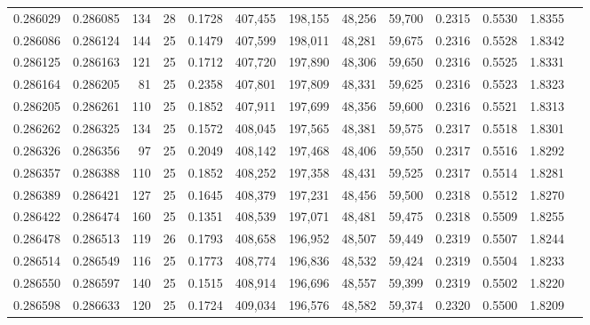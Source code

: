 \begin{tabular}{rrrrrrrrrrrrr}
0.286029 & 0.286085 &   134 &  28 &                                     0.1728 & 407,455 & 198,155 &  48,256 &  59,700 & 0.2315 & 0.5530 & 1.8355 \\
0.286086 & 0.286124 &   144 &  25 &                                     0.1479 & 407,599 & 198,011 &  48,281 &  59,675 & 0.2316 & 0.5528 & 1.8342 \\
0.286125 & 0.286163 &   121 &  25 &                                     0.1712 & 407,720 & 197,890 &  48,306 &  59,650 & 0.2316 & 0.5525 & 1.8331 \\
0.286164 & 0.286205 &    81 &  25 &                                     0.2358 & 407,801 & 197,809 &  48,331 &  59,625 & 0.2316 & 0.5523 & 1.8323 \\
0.286205 & 0.286261 &   110 &  25 &                                     0.1852 & 407,911 & 197,699 &  48,356 &  59,600 & 0.2316 & 0.5521 & 1.8313 \\
0.286262 & 0.286325 &   134 &  25 &                                     0.1572 & 408,045 & 197,565 &  48,381 &  59,575 & 0.2317 & 0.5518 & 1.8301 \\
0.286326 & 0.286356 &    97 &  25 &                                     0.2049 & 408,142 & 197,468 &  48,406 &  59,550 & 0.2317 & 0.5516 & 1.8292 \\
0.286357 & 0.286388 &   110 &  25 &                                     0.1852 & 408,252 & 197,358 &  48,431 &  59,525 & 0.2317 & 0.5514 & 1.8281 \\
0.286389 & 0.286421 &   127 &  25 &                                     0.1645 & 408,379 & 197,231 &  48,456 &  59,500 & 0.2318 & 0.5512 & 1.8270 \\
0.286422 & 0.286474 &   160 &  25 &                                     0.1351 & 408,539 & 197,071 &  48,481 &  59,475 & 0.2318 & 0.5509 & 1.8255 \\
0.286478 & 0.286513 &   119 &  26 &                                     0.1793 & 408,658 & 196,952 &  48,507 &  59,449 & 0.2319 & 0.5507 & 1.8244 \\
0.286514 & 0.286549 &   116 &  25 &                                     0.1773 & 408,774 & 196,836 &  48,532 &  59,424 & 0.2319 & 0.5504 & 1.8233 \\
0.286550 & 0.286597 &   140 &  25 &                                     0.1515 & 408,914 & 196,696 &  48,557 &  59,399 & 0.2319 & 0.5502 & 1.8220 \\
0.286598 & 0.286633 &   120 &  25 &                                     0.1724 & 409,034 & 196,576 &  48,582 &  59,374 & 0.2320 & 0.5500 & 1.8209 \\

\end{tabular}
